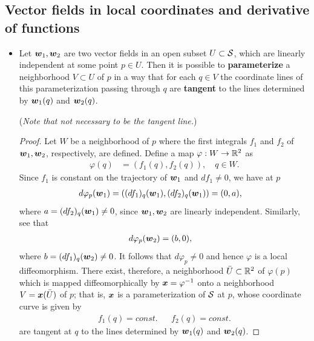 \documentclass[11pt]{article}
\begin{document}
\subsection{Vector fields in local coordinates and derivative of functions}
\begin{itemize}
\item \begin{theorem}\label{thm: local_parm_vec_field}
Let $\boldsymbol{w}_{1}, \boldsymbol{w}_{2}$ are two vector fields in an open subset $U\subset {\mathcal S}$, which are linearly independent at some point $p\in U$. Then it is possible to \textbf{parameterize} a neighborhood $V\subset U$ of $p$ in a way that for each $q\in V$ the coordinate lines of this parameterization passing through $q$ are \textbf{tangent} to the lines determined by $\boldsymbol{w}_{1}(q)$ and $\boldsymbol{w}_{2}(q)$.
 \end{theorem}
 (\emph{Note that not necessary to be the tangent line.})
 \begin{proof}
 Let $W$ be a neighborhood of $p$ where the first integrals $f_{1}$ and $f_{2}$ of $\boldsymbol{w}_{1}, \boldsymbol{w}_{2}$, respectively, are defined. Define a map $\varphi: W\rightarrow {\mathbb R}^{2}$ as
 \begin{align*}
 \varphi(q) &= (f_{1}(q), f_{2}(q)), \quad q\in W.
 \end{align*}
 Since $f_{1}$ is constant on the trajectory of $\boldsymbol{w}_{1}$ and $df_{1}\neq 0$, we have at $p$
 \begin{align*}
 d\varphi_{p}(\boldsymbol{w}_{1}) &= ((df_{1})_{q}(\boldsymbol{w}_{1}), (df_{2})_{q}(\boldsymbol{w}_{1})) = (0, a),
 \end{align*}
 where $a=  (df_{2})_{q}(\boldsymbol{w}_{1})\neq 0$, since $\boldsymbol{w}_{1}, \boldsymbol{w}_{2}$ are linearly independent. Similarly, see that
  \begin{align*}
 d\varphi_{p}(\boldsymbol{w}_{2}) &= (b,0),
 \end{align*}
 where $b = (df_{1})_{q}(\boldsymbol{w}_{2})\neq 0$. It follows that $ d\varphi_{p}\neq 0$ and hence $\varphi$ is a local diffeomorphism. There exist, therefore, a neighborhood $\bar{U}\subset {\mathbb R}^{2}$ of $\varphi(p)$ which is mapped diffeomorphically by $\boldsymbol{x} = \varphi^{-1}$ onto a neighborhood $V = \boldsymbol{x}(\bar{U})$ of $p$; that is, $\boldsymbol{x}$ is a parameterization of ${\mathcal S}$ at $p$, whose coordinate curve is given by 
 \begin{align*}
 f_{1}(q) = const. && f_{2}(q) = const.
 \end{align*}
 are tangent at $q$ to the lines determined by $\boldsymbol{w}_{1}(q)$ and $\boldsymbol{w}_{2}(q)$.\QEDA
 \end{proof}
 

\end{itemize}
\end{document}

